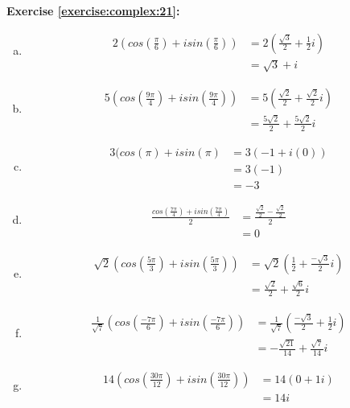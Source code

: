\noindent\textbf{Exercise \ref{exercise:complex:21}:} %
\begin{enumerate}[(a)]
\item
\begin{align*}
2\left(cos\left(\frac{\pi}{6}\right) + isin\left(\frac{\pi}{6}\right)\right) &= 2\left(\frac{\sqrt{3}}{2} + \frac{1}{2}i \right)\\
&= \sqrt{3} + i
\end{align*}

\item
\begin{align*}
5\left(cos\left(\frac{9\pi}{4}\right) + isin\left(\frac{9\pi}{4}\right)\right) &= 5\left(\frac{\sqrt{2}}{2} + \frac{\sqrt{2}}{2}i\right)\\
&= \frac{5\sqrt{2}}{2} + \frac{5\sqrt{2}}{2}i
\end{align*}

\item
\begin{align*}
3(cos(\pi) + isin(\pi) &= 3(-1 + i(0))\\
&= 3(-1)\\
&= -3
\end{align*}

\item
\begin{align*}
\frac{cos\left(\frac{7\pi}{4}\right) + isin\left(\frac{7\pi}{4}\right)}{2} &= \frac{\frac{\sqrt{2}}{2} - \frac{\sqrt{2}}{2}}{2}\\
&=0
\end{align*}

\item
\begin{align*}
\sqrt{2}\left(cos\left(\frac{5\pi}{3}\right) + isin\left(\frac{5\pi}{3}\right)\right) &= \sqrt{2}\left(\frac{1}{2} + \frac{-\sqrt{3}}{2}i\right)\\
&= \frac{\sqrt{2}}{2} + \frac{\sqrt{6}}{2}i
\end{align*}

\item
\begin{align*}
\frac{1}{\sqrt{7}}\left(cos\left(\frac{-7\pi}{6}\right) + isin\left(\frac{-7\pi}{6}\right)\right) &= \frac{1}{\sqrt{7}}\left(\frac{-\sqrt{3}}{2} + \frac{1}{2}i\right)\\
&= -\frac{\sqrt{21}}{14} + \frac{\sqrt{7}}{14}i
\end{align*}

\item
\begin{align*}
14\left(cos\left(\frac{30\pi}{12}\right) + isin\left(\frac{30\pi}{12}\right)\right) &= 14(0 + 1i)\\
&= 14i 
\end{align*}
\end{enumerate}

